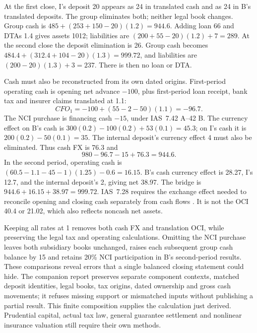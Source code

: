 At the first close, I's deposit 20 appears as 24 in translated cash and as 24
in B's translated deposits. The group eliminates both; neither legal book
changes. Group cash is \(485+(253+150-20)(1.2)=944.6\). Adding loan 66 and
DTAs 1.4 gives assets 1012; liabilities are
\((200+55-20)(1.2)+7=289\). At the second close the deposit elimination
is 26. Group cash becomes \(484.4+(312.4+104-20)(1.3)=999.72\), and liabilities
are \((200-20)(1.3)+3=237\). There is then no loan or DTA.

Cash must also be reconstructed from its own dated origins. First-period
operating cash is opening net advance \(-100\), plus first-period loan receipt,
bank tax and insurer claims translated at 1.1:
\begin{equation}
 CFO_1=-100+(55-2-50)(1.1)=-96.7.
\end{equation}
The NCI purchase is financing cash \(-15\), under IAS~7.42 A--42 B.
The currency effect on B's cash is
\(300(0.2)-100(0.2)+53(0.1)=45.3\); on I's cash it is
\(200(0.2)-50(0.1)=35\). The internal deposit's currency effect 4 must also
be eliminated. Thus cash FX is 76.3 and
\begin{equation}
 980-96.7-15+76.3=944.6.
\end{equation}
In the second period, operating cash is
\((60.5-1.1-45-1)(1.25)-0.6=16.15\). B's cash currency effect is 28.27,
I's 12.7, and the internal deposit's 2, giving net 38.97. The bridge is
\(944.6+16.15+38.97=999.72\). IAS~7.28 requires the exchange effect needed
to reconcile opening and closing cash separately from cash flows
\citep{eu20231803}. It is not the OCI 40.4 or 21.02, which also reflects
noncash net assets.

Keeping all rates at 1 removes both cash FX and translation OCI, while
preserving the legal tax and operating calculations. Omitting the NCI purchase
leaves both subsidiary books unchanged, raises each subsequent group cash
balance by 15 and retains 20\% NCI participation in B's second-period results.
These comparisons reveal errors that a single balanced closing statement could
hide. The companion  report preserves separate component
contexts, matched deposit identities, legal books, tax origins, dated ownership
and gross cash movements; it refuses missing support or mismatched inputs
without publishing a partial result. This finite composition supplies the
calculation just derived. Prudential capital, actual tax law, general guarantee
settlement and nonlinear insurance valuation still require their own methods.
